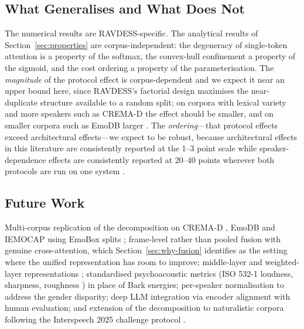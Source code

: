 \documentclass[journal,onecolumn,11pt,draftclsnofoot]{IEEEtran}   %
\begin{document}
\subsection{What Generalises and What Does Not}
\label{sec:generalise}
The numerical results are RAVDESS-specific. The analytical results of
Section~\ref{sec:properties} are corpus-independent: the degeneracy of
single-token attention is a property of the softmax, the convex-hull
confinement a property of the sigmoid, and the cost ordering a property of the
parameterisation. The \emph{magnitude} of the protocol effect is
corpus-dependent and we expect it near an upper bound here, since RAVDESS's
factorial design maximises the near-duplicate structure available to a random
split; on corpora with lexical variety and more speakers such as CREMA-D
\cite{cao2014cremad} the effect should be smaller, and on smaller corpora such
as EmoDB \cite{burkhardt2005emodb} larger \cite{rosenblatt2024leakage}. The
\emph{ordering}---that protocol effects exceed architectural effects---we expect
to be robust, because architectural effects in this literature are consistently
reported at the 1--3 point scale while speaker-dependence effects are
consistently reported at 20--40 points wherever both protocols are run on one
system \cite{ibrahim2026multimodal,portal2025benchmarking}.

\subsection{Future Work}
\label{sec:future}
Multi-corpus replication of the decomposition on CREMA-D \cite{cao2014cremad},
EmoDB \cite{burkhardt2005emodb} and IEMOCAP \cite{busso2008iemocap} using EmoBox
splits \cite{ma2024emobox}; frame-level rather than pooled fusion with genuine
cross-attention, which Section~\ref{sec:why-fusion} identifies as the setting
where the unified representation has room to improve; middle-layer and
weighted-layer representations \cite{pasad2023comparative,chiu2025probing};
standardised psychoacoustic metrics (ISO 532-1 loudness, sharpness, roughness
\cite{iso532}) in place of Bark energies; per-speaker normalisation to address
the gender disparity; deep LLM integration via encoder alignment
\cite{kang2025frozen,kim2024paralinguistics} with human evaluation; and
extension of the decomposition to naturalistic corpora following the Interspeech
2025 challenge protocol \cite{naini2025challenge}.

\end{document}
